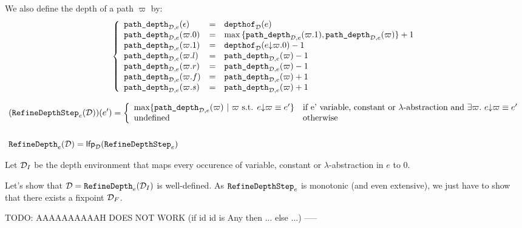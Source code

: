 \documentclass[a4paper]{article}
\theoremstyle{definition}
\begin{document}
    We also define the depth of a path $\varpi$ by:
    \[
      \left\{
        \begin{array}{lcl}
          \texttt{path\_depth}_{\mathcal{D},e}(\epsilon) & = & \texttt{depthof}_{\mathcal{D}}(e)\\
          \texttt{path\_depth}_{\mathcal{D},e}(\varpi.0) & = & \max {\{\texttt{path\_depth}_{\mathcal{D},e}(\varpi.1),\texttt{path\_depth}_{\mathcal{D},e}(\varpi)\}}+1\\
          \texttt{path\_depth}_{\mathcal{D},e}(\varpi.1) & = & \texttt{depthof}_{\mathcal{D}}(e{\downarrow}\varpi.0)-1\\
          \texttt{path\_depth}_{\mathcal{D},e}(\varpi.l) & = & \texttt{path\_depth}_{\mathcal{D},e}(\varpi)-1\\
          \texttt{path\_depth}_{\mathcal{D},e}(\varpi.r) & = & \texttt{path\_depth}_{\mathcal{D},e}(\varpi)-1\\
          \texttt{path\_depth}_{\mathcal{D},e}(\varpi.f) & = & \texttt{path\_depth}_{\mathcal{D},e}(\varpi)+1\\
          \texttt{path\_depth}_{\mathcal{D},e}(\varpi.s) & = & \texttt{path\_depth}_{\mathcal{D},e}(\varpi)+1
        \end{array}  
      \right.
    \]

    \begin{align*}
      &(\texttt{RefineDepthStep}_{e} (\mathcal{D}))(e') = 
        \left\{\begin{array}{ll}
          \max \{\texttt{path\_depth}_{\mathcal{D},e}(\varpi) ~|~ \varpi \text{ s.t. } e{\downarrow}\varpi \equiv e'\} & \text{if e' variable, constant or $\lambda$-abstraction and } \exists \varpi.\ e{\downarrow}\varpi \equiv e'\\
          \text{undefined} & \text{otherwise}
        \end{array}\right.\\&\\
      &\texttt{RefineDepth}_{e}(\mathcal{D})=\textsf{lfp}_{\mathcal{D}} (\texttt{RefineDepthStep}_{e})
    \end{align*}

    Let $\mathcal{D}_I$ be the depth environment that maps every occurence of variable, constant or $\lambda$-abstraction
    in $e$ to $0$.

    Let's show that $\mathcal{D} = \texttt{RefineDepth}_{e}(\mathcal{D}_I)$ is well-defined.
    As $\texttt{RefineDepthStep}_{e}$ is monotonic (and even extensive), we just have to show that there exists a fixpoint $\mathcal{D}_F$.

    TODO: AAAAAAAAAAH DOES NOT WORK (if id id is Any then ... else ...)
    -----
\end{document}
